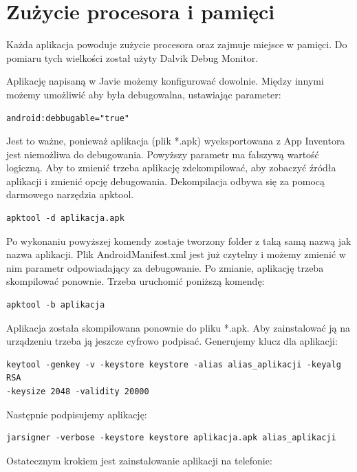 \section{Zużycie procesora i pamięci}

Każda aplikacja powoduje zużycie procesora oraz zajmuje miejsce w pamięci. Do pomiaru tych wielkości został użyty Dalvik Debug Monitor.

Aplikację napisaną w Javie możemy konfigurować dowolnie. Między innymi możemy umożliwić aby była debugowalna, ustawiając parameter:

\begin{lstlisting}
android:debbugable="true"
\end{lstlisting}

Jest to ważne, ponieważ aplikacja (plik *.apk) wyeksportowana z App Inventora jest niemożliwa do debugowania. Powyższy parametr ma fałszywą wartość logiczną. Aby to zmienić trzeba aplikację zdekompilować, aby zobaczyć źródła aplikacji i zmienić opcję debugowania. Dekompilacja odbywa się za pomocą darmowego narzędzia apktool.

\begin{lstlisting}
apktool -d aplikacja.apk
\end{lstlisting}

Po wykonaniu powyższej komendy zostaje tworzony folder z taką samą nazwą jak nazwa aplikacji. Plik AndroidManifest.xml jest już czytelny i możemy zmienić w nim parametr odpowiadający za debugowanie. Po zmianie, aplikację trzeba skompilować ponownie. Trzeba uruchomić poniższą komendę:

\begin{lstlisting}
apktool -b aplikacja
\end{lstlisting}

Aplikacja została skompilowana ponownie do pliku *.apk. Aby zainstalować ją na urządzeniu trzeba ją jeszcze cyfrowo podpisać. Generujemy klucz dla aplikacji:

\begin{lstlisting}
keytool -genkey -v -keystore keystore -alias alias_aplikacji -keyalg RSA 
-keysize 2048 -validity 20000
\end{lstlisting}

Następnie podpisujemy aplikację:

\begin{lstlisting}
jarsigner -verbose -keystore keystore aplikacja.apk alias_aplikacji
\end{lstlisting}

Ostatecznym krokiem jest zainstalowanie aplikacji na telefonie:

